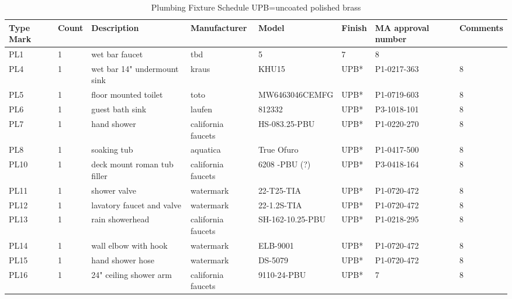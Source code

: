 \documentclass{article}
\begin{document}
\begin{sidewaystable}[h!]
\begin{center}
\caption{\large Plumbing Fixture Schedule \tiny *UPB=uncoated polished brass}
\begin{tabular}{l|l|l|l|l|l|l|l}
\textbf{Type Mark} & \textbf{Count} & \textbf{Description} & \textbf{Manufacturer} & \textbf{Model} & \textbf{Finish} & \textbf{MA approval number}  & \textbf{Comments} \\
\hline
\hline
PL1   & 1  & wet bar faucet & tbd & 5 & 7 & 8 \\ 
\hline
PL4   & 1  & wet bar 14" undermount sink & kraus & KHU15 & UPB* & P1-0217-363 & 8 \\ 
\hline
PL5   & 1  & floor mounted toilet & toto & MW6463046CEMFG & UPB* & P1-0719-603 & 8 \\
\hline
PL6   & 1  & guest bath sink & laufen & 812332 & UPB* & P3-1018-101 & 8 \\
\hline
PL7   & 1  & hand shower & california faucets & HS-083.25-PBU &UPB* & P1-0220-270 & 8 \\
\hline
PL8   & 1  & soaking tub & aquatica & True Ofuro &UPB* & P1-0417-500 & 8 \\
\hline
PL10 & 1  & deck mount roman tub filler & california faucets & 6208 -PBU (?) & UPB* & P3-0418-164  & 8 \\
\hline
PL11 & 1  & shower valve & watermark & 22-T25-TIA  & UPB* & P1-0720-472  & 8 \\
\hline
PL12 & 1  & lavatory faucet and valve & watermark & 22-1.2S-TIA & UPB* & P1-0720-472 & 8 \\
\hline
PL13 & 1  & rain showerhead & california faucets & SH-162-10.25-PBU & UPB* &  P1-0218-295 & 8 \\
\hline
PL14 & 1  & wall elbow with hook & watermark & ELB-9001 & UPB* & P1-0720-472 & 8 \\
\hline
PL15 & 1  & hand shower hose & watermark & DS-5079  & UPB* & P1-0720-472 & 8 \\
\hline
PL16 & 1  & 24" ceiling shower arm & california faucets & 9110-24-PBU  &UPB* & 7 & 8 \\

\end{tabular}
\end{center}
\end{sidewaystable}
\end{document}
